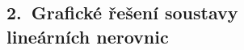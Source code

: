 \documentclass[preview]{standalone}
\begin{document}
\begin{center}
\centering \section*{2.~Grafické řešení soustavy\\ lineárních nerovnic}
\end{center}
\end{document}
